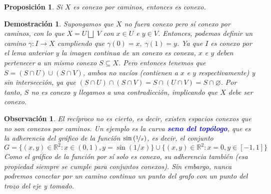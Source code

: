 \documentclass[12pt,twoside]{report}
\theoremstyle{azul}
\newtheorem*{propx}{Proposición}
\newtheorem*{demx}{Demostración}
\theoremstyle{azul2}
\newtheorem*{obsx}{Observación}
\theoremstyle{plain}
\theoremstyle{definition}
\theoremstyle{remark}
\begin{document}
\begin{propx} \label{cpc}
Si $X$ es conexo por caminos, entonces es conexo.
\end{propx}
\begin{demx}
Supongamos que $X$ no fuera conexo pero sí conexo por caminos, con lo que $X= U \bigsqcup \; V$ con $x \in U$ e $y \in V$. Entonces, podemos definir un camino $\gamma: I \rightarrow X$ cumpliendo que $\gamma(0)=x, \; \gamma(1)=y$. Ya que $I$ es conexo por el lema anterior y la imagen continua de un conexo es conexa, $x$ e $y$ deben pertenecer a un mismo conexo $S \subseteq X$. Pero entonces tenemos que $S = (S \cap U) \cup (S \cap V)$, ambos no vacíos (contienen a $x$ e $y$ respectivamente) y sin intersección, ya que $(S \cap U) \cap (S \cap V) = S \cap (U \cap V) = S \cap \varnothing$. Por tanto, $S$ no es conexo y llegamos a una contradicción, implicando que $X$ debe ser conexo.
\end{demx}
\begin{obsx}
El recíproco no es cierto, es decir, existen espacios conexos que no son conexos por caminos. Un ejemplo es la curva \textcolor{blue}{\textbf{seno del topólogo}}, que es la adherencia del gráfico de la función $\sin\left(\nicefrac{1}{x}\right)$, es decir, el conjunto
$$ G=\{(x,y)\in \mathbb {R} ^{2}:x\in (0,1),y=\sin(1/x)\}\cup \{(x,y)\in \mathbb {R} ^{2}:x=0,y\in [-1,1]\}$$
Como el gráfico de la función por sí solo es conexo, su adherencia también (esa propiedad siempre se cumple para conjuntos conexos). Sin embargo, nunca podremos conectar por un camino continuo un punto del grafo con un punto del trozo del eje y tomado.
\end{obsx}
\end{document}
